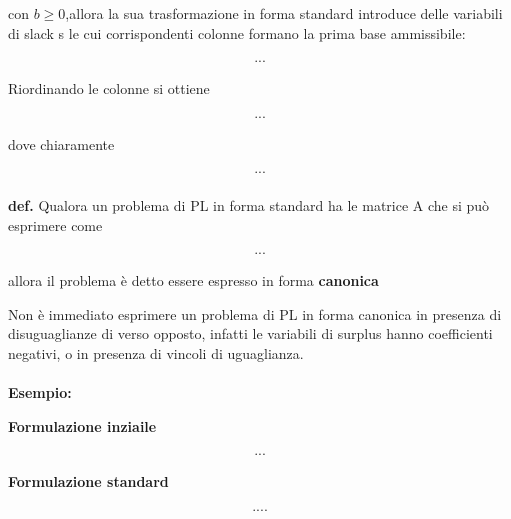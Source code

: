 \documentclass[a4paper, 11pt]{article}
\begin{document}
        con $b \geq 0$,allora la sua trasformazione in forma standard introduce delle variabili di slack s le cui corrispondenti colonne formano la prima base ammissibile: 

        \begin{align}
            ...
        \end{align}

        Riordinando le colonne si ottiene

        \begin{align}
            ...
        \end{align}

        dove chiaramente

        \begin{align}
            ...
        \end{align}

        \paragraph{}
        \textbf{def. }  Qualora un problema di PL in forma standard ha le matrice A che si può esprimere come

        \begin{align}
            ...
        \end{align}

        allora il problema è detto essere espresso in forma \textbf{canonica}

        Non è immediato esprimere un problema di PL in forma canonica in presenza di disuguaglianze di verso opposto, infatti le variabili di surplus hanno coefficienti negativi, o in presenza di vincoli di uguaglianza.


        \paragraph{}
        \textbf{Esempio: }

        \textbf{Formulazione inziaile}

        \begin{align}
            ...
        \end{align}



        \textbf{Formulazione  standard}

        \begin{align}
            ....
        \end{align}
\end{document}
